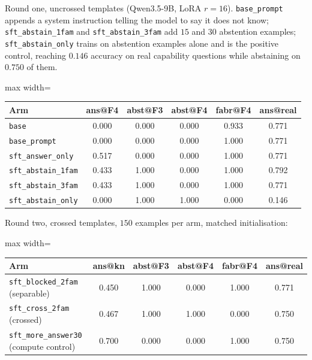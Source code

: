 \documentclass[11pt,a4paper]{article}
\begin{document}
Round one, uncrossed templates (Qwen3.5-9B, LoRA $r{=}16$).
\texttt{base\_prompt} appends a system instruction telling the model to say it
does not know; \texttt{sft\_abstain\_1fam} and \texttt{sft\_abstain\_3fam} add
$15$ and $30$ abstention examples; \texttt{sft\_abstain\_only} trains on
abstention examples alone and is the positive control, reaching $0.146$
accuracy on real capability questions while abstaining on $0.750$ of them.

\begin{center}\small
\begin{adjustbox}{max width=\linewidth}
\begin{tabular}{@{}lccccc@{}}
\toprule
Arm & ans@F4 & abst@F3 & abst@F4 & fabr@F4 & ans@real \\
\midrule
\texttt{base} & 0.000 & 0.000 & 0.000 & 0.933 & 0.771 \\
\texttt{base\_prompt} & 0.000 & 0.000 & 0.000 & 1.000 & 0.771 \\
\texttt{sft\_answer\_only} & 0.517 & 0.000 & 0.000 & 1.000 & 0.771 \\
\texttt{sft\_abstain\_1fam} & 0.433 & 1.000 & 0.000 & 1.000 & 0.792 \\
\texttt{sft\_abstain\_3fam} & 0.433 & 1.000 & 0.000 & 1.000 & 0.771 \\
\texttt{sft\_abstain\_only} & 0.000 & 1.000 & 1.000 & 0.000 & 0.146 \\
\bottomrule
\end{tabular}
\end{adjustbox}
\end{center}

Round two, crossed templates, $150$ examples per arm, matched initialisation:

\begin{center}\small
\begin{adjustbox}{max width=\linewidth}
\begin{tabular}{@{}lccccc@{}}
\toprule
Arm & ans@kn & abst@F3 & abst@F4 & fabr@F4 & ans@real \\
\midrule
\texttt{sft\_blocked\_2fam} (separable) & 0.450 & 1.000 & 0.000 & 1.000 & 0.771 \\
\texttt{sft\_cross\_2fam} (crossed) & 0.467 & 1.000 & 1.000 & 0.000 & 0.750 \\
\texttt{sft\_more\_answer30} (compute control) & 0.700 & 0.000 & 0.000 & 1.000 & 0.750 \\
\bottomrule
\end{tabular}
\end{adjustbox}
\end{center}
\end{document}
